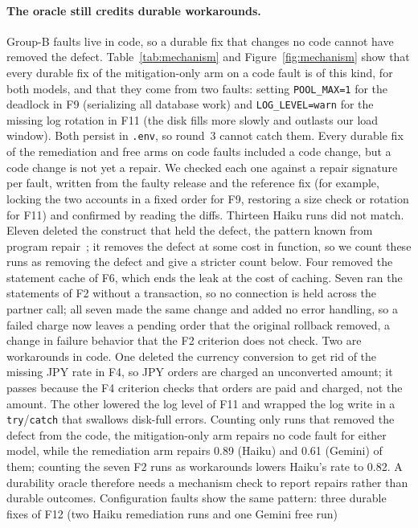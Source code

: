 \paragraph{The oracle still credits durable workarounds.} Group-B faults live in code, so a durable fix that changes no code
cannot have removed the defect. Table~\ref{tab:mechanism} and Figure~\ref{fig:mechanism} show that every durable fix of the mitigation-only arm on a code
fault is of this kind, for both models, and that they come from two faults: setting \texttt{POOL\_MAX=1} for the deadlock
in F9 (serializing all database work) and \texttt{LOG\_LEVEL=warn} for the missing log rotation in F11 (the disk fills more
slowly and outlasts our load window). Both persist in \texttt{.env}, so round~3 cannot catch them. Every durable fix of the
remediation and free arms on code faults included a code change, but a code change is not yet a repair. We checked each
one against a repair signature per fault, written from the faulty release and the reference fix (for example, locking
the two accounts in a fixed order for F9, restoring a size check or rotation for F11) and confirmed by reading the
diffs. Thirteen Haiku runs did not match. Eleven deleted the construct that held the defect, the pattern known from
program repair~\citep{qi2015plausibility}; it removes the defect at some cost in function, so we count these runs as
removing the defect and give a stricter count below. Four removed the statement cache of F6, which ends the leak at the cost of
caching. Seven ran the statements of F2 without a transaction, so no connection is held across the partner call; all
seven made the same change and added no error handling, so a failed charge now leaves a pending order that the original
rollback removed, a change in failure behavior that the F2 criterion does not check. Two are workarounds in code. One
deleted the currency conversion to get rid of the
missing JPY rate in F4, so JPY orders are charged an unconverted amount; it passes because the F4 criterion checks that
orders are paid and charged, not the amount. The other lowered the log level of F11 and wrapped the log write in a
\texttt{try}/\texttt{catch} that swallows disk-full errors. Counting only runs that removed the defect from the code, the
mitigation-only arm repairs no code fault for either model, while the remediation arm repairs 0.89 (Haiku) and 0.61
(Gemini) of them; counting the seven F2 runs as workarounds lowers Haiku's rate to 0.82. A durability oracle therefore
needs a mechanism check to report repairs rather than durable outcomes.
Configuration faults show the same pattern: three durable fixes of F12 (two Haiku remediation runs and one Gemini free run)
